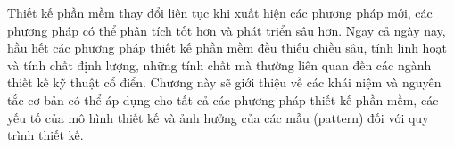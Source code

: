 \documentclass[12pt, a4paper]{article}
\begin{document}
	
	Thiết kế phần mềm thay đổi liên tục khi xuất hiện các phương pháp mới, các phương pháp có thể phân tích tốt hơn và phát triển sâu hơn. Ngay cả ngày nay, hầu hết các phương pháp thiết kế phần mềm đều thiếu chiều sâu, tính linh hoạt và tính chất định lượng, những tính chất mà thường liên quan đến các ngành thiết kế kỹ thuật cổ điển. Chương này sẽ giới thiệu về các khái niệm và nguyên tắc cơ bản có thể áp dụng cho tất cả các phương pháp thiết kế phần mềm, các yếu tố của mô hình thiết kế và ảnh hưởng của các mẫu (pattern) đối với quy trình thiết kế.

	
	
	
	
	
	
	
	
	
	
	

	\clearpage
	\nocite{*}
	\printbibliography[heading=bibintoc, title=Tài liệu tham khảo]
	
	\clearpage
	\printindex
	
\end{document}
